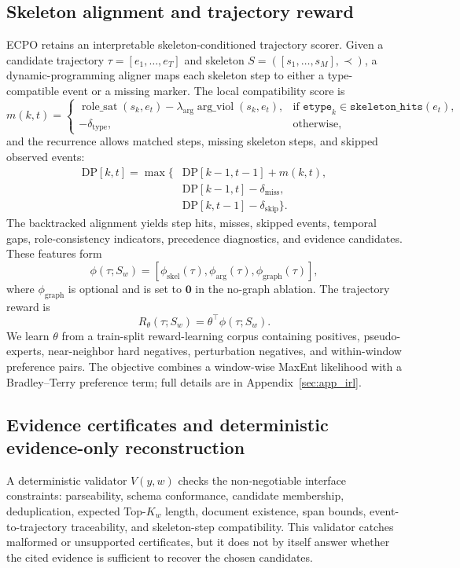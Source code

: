 \documentclass{article}
\begin{document}
\subsection{Skeleton alignment and trajectory reward}
ECPO retains an interpretable skeleton-conditioned trajectory scorer. Given a candidate trajectory $\tau=[e_1,\ldots,e_T]$ and skeleton $S=([s_1,\ldots,s_M],\prec)$, a dynamic-programming aligner maps each skeleton step to either a type-compatible event or a missing marker. The local compatibility score is
\begin{equation}
m(k,t)=
\begin{cases}
\operatorname{role\_sat}(s_k,e_t)
-\lambda_{\mathrm{arg}}\operatorname{arg\_viol}(s_k,e_t),
& \text{if } \texttt{etype}_k\in \texttt{skeleton\_hits}(e_t),\\[2pt]
-\delta_{\mathrm{type}},& \text{otherwise,}
\end{cases}
\end{equation}
and the recurrence allows matched steps, missing skeleton steps, and skipped observed events:
\begin{equation}
\begin{aligned}
\mathrm{DP}[k,t]=\max\{&\mathrm{DP}[k-1,t-1]+m(k,t),\\
&\mathrm{DP}[k-1,t]-\delta_{\mathrm{miss}},\\
&\mathrm{DP}[k,t-1]-\delta_{\mathrm{skip}}\}.
\end{aligned}
\end{equation}
The backtracked alignment yields step hits, misses, skipped events, temporal gaps, role-consistency indicators, precedence diagnostics, and evidence candidates. These features form
\begin{equation}
\phi(\tau;S_w)=
[\phi_{\mathrm{skel}}(\tau),\phi_{\mathrm{arg}}(\tau),\phi_{\mathrm{graph}}(\tau)],
\end{equation}
where $\phi_{\mathrm{graph}}$ is optional and is set to $\mathbf{0}$ in the no-graph ablation. The trajectory reward is
\begin{equation}
R_\theta(\tau;S_w)=\theta^\top\phi(\tau;S_w).
\end{equation}
We learn $\theta$ from a train-split reward-learning corpus containing positives, pseudo-experts, near-neighbor hard negatives, perturbation negatives, and within-window preference pairs. The objective combines a window-wise MaxEnt likelihood with a Bradley--Terry preference term; full details are in Appendix~\ref{sec:app_irl}.

\subsection{Evidence certificates and deterministic evidence-only reconstruction}
\label{sec:method_det_verifier}
A deterministic validator $V(y,w)$ checks the non-negotiable interface constraints: parseability, schema conformance, candidate membership, deduplication, expected Top-$K_w$ length, document existence, span bounds, event-to-trajectory traceability, and skeleton-step compatibility. This validator catches malformed or unsupported certificates, but it does not by itself answer whether the cited evidence is sufficient to recover the chosen candidates.
\end{document}
